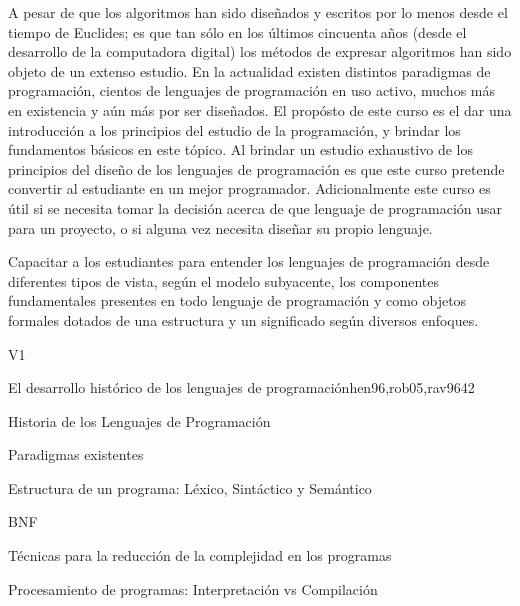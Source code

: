 \begin{syllabus}


\begin{justification}
   A pesar de que los algoritmos han sido diseñados y escritos por lo menos
   desde el tiempo de Euclides; es que tan sólo en los últimos cincuenta años
   (desde el desarrollo de la computadora digital) los métodos de expresar
   algoritmos han sido objeto de un extenso estudio. En la actualidad existen
   distintos paradigmas de programación, cientos de lenguajes de programación
   en uso activo, muchos más en existencia y aún más por ser diseñados.
   El propósto de este curso es el dar una introducción a los principios del
   estudio de la programación, y brindar los fundamentos básicos en este
   tópico. Al brindar un estudio exhaustivo de los principios del diseño de los
   lenguajes de programación es que este curso pretende convertir al estudiante
   en un mejor programador. Adicionalmente este curso es útil si se necesita
   tomar la decisión acerca de que lenguaje de programación usar para un
   proyecto, o si alguna vez necesita diseñar su propio lenguaje.
   \end{justification}
   
   \begin{goals}
   \item Capacitar a los estudiantes para entender los lenguajes de programación desde 
   diferentes tipos de vista, según el modelo subyacente, los componentes fundamentales 
   presentes en todo lenguaje de programación y como objetos formales dotados de una 
   estructura y un significado según diversos enfoques.
   \end{goals}
   
   \begin{outcomes}{V1}
      \item {}
      \item {}
      \item {}
      \item {}
   \end{outcomes}
   
   \begin{unit}{El desarrollo histórico de los lenguajes de programación}{}{hen96,rob05,rav96}{4}{2}
   \begin{topics}
         \item Historia de los Lenguajes de Programación
         \item Paradigmas existentes
         \item Estructura de un programa: Léxico, Sintáctico y Semántico
         \item BNF
         \item Técnicas para la reducción de la complejidad en los programas
         \item Procesamiento de programas: Interpretación vs Compilación
      \end{topics}
   

\end{unit}
\end{syllabus}
